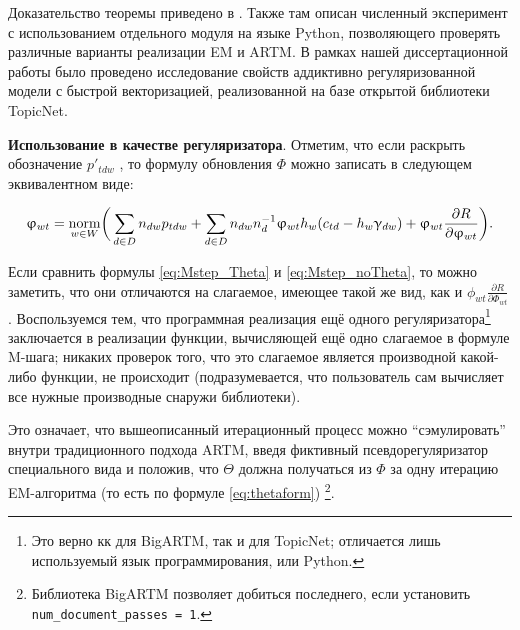 

Доказательство теоремы приведено в \cite{thetaless}. Также там описан численный эксперимент с использованием отдельного модуля на языке Python, позволяющего проверять различные варианты реализации EM и ARTM. В рамках нашей диссертационной работы было проведено исследование свойств аддиктивно регуляризованной модели с быстрой векторизацией, реализованной на базе открытой библиотеки TopicNet. 

 

\textbf{Использование в качестве регуляризатора}. Отметим, что если раскрыть обозначение $p'_{tdw}$ , то формулу обновления $\Phi$ можно записать в следующем эквивалентном виде: 

 

\begin{equation} 

\label{eq:Mstep_noTheta}     

    \phi_{wt} = \norm_{w\in W} 

        \biggl(\, 

        \sum_{d\in D} n_{dw} p_{tdw} 

        + \sum_{d\in D} n_{dw} n_d^{-1} \phi_{wt}h_w (c_{td}-h_w\gamma_{dw}) 

        + \phi_{wt} \frac{\partial{R}}{\partial{\phi_{wt}}} 

        \biggr). 

\end{equation} 

 

Если сравнить формулы \ref{eq:Mstep_Theta} и \ref{eq:Mstep_noTheta}, то можно заметить, что они отличаются на слагаемое, имеющее такой же вид, как и $\phi_{wt} \frac{\partial{R}}{\partial{\Phi_{wt}}}$. Воспользуемся тем, что программная реализация ещё одного регуляризатора\footnote{Это верно кк для BigARTM, так и для TopicNet; отличается лишь используемый язык программирования, \cpp или Python.}  заключается в реализации функции, вычисляющей ещё одно слагаемое в формуле M-шага; никаких проверок того, что это слагаемое является производной какой-либо функции, не происходит (подразумевается, что пользователь сам вычисляет все нужные производные снаружи библиотеки). 

 

Это означает, что вышеописанный итерационный процесс можно ``сэмулировать'' внутри традиционного подхода ARTM, введя фиктивный псевдорегуляризатор специального вида и положив, что $\Theta$ должна получаться из $\Phi$ за одну итерацию EM-алгоритма (то есть по формуле \ref{eq:thetaform}) \footnote{Библиотека BigARTM позволяет добиться последнего, если установить \texttt{num\_document\_passes\ =\ 1}.}. 

